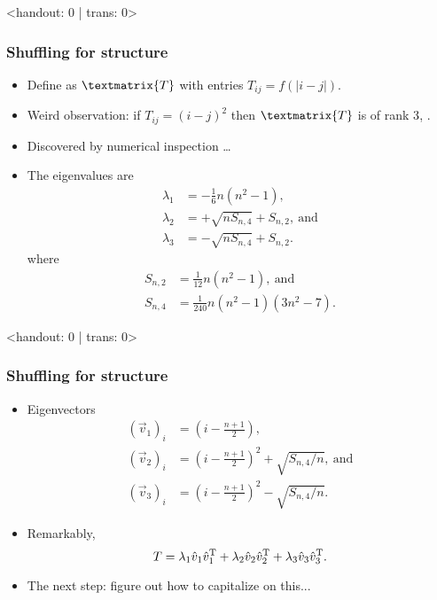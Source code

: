 \begin{frame}<handout: 0 | trans: 0>
  \frametitle{Shuffling for structure}

  \begin{itemize}
  \item<1->
    Define  as $\textmatrix{T}$ with
    entries $T_{ij} = f(|i-j|)$.
  \item<2->
    Weird observation: if $T_{ij} = (i-j)^2$
    then $\textmatrix{T}$ is of \alert{rank 3}, .
  \item<3->
    Discovered by numerical inspection \ldots
  \item<4->
    The eigenvalues are 
    \begin{align}
      \lambda_1 & = -\frac{1}{6}n(n^2-1), \nonumber \\
      \lambda_2 & = +\sqrt{n S_{n,4}} + S_{n,2}, \ \mbox{and} \nonumber \\
      \lambda_3 & = -\sqrt{n S_{n,4}} + S_{n,2}. \nonumber
    \end{align}
    where
    \begin{align}
      S_{n,2} &= \frac{1}{12} n (n^2-1), \ \mbox{and} \nonumber \\
      S_{n,4} & = \frac{1}{240}n(n^2-1)(3n^2 - 7).
      \nonumber
    \end{align}

  \end{itemize}

\end{frame}

\begin{frame}<handout: 0 | trans: 0>
  \frametitle{Shuffling for structure}

  \begin{itemize}
  \item<1->
    Eigenvectors
    \begin{align}
      \left(\vec{v}_1\right)_i & = \left( i - \frac{n+1}{2} \right), \nonumber \\
      \left(\vec{v}_2\right)_i & = \left( i - \frac{n+1}{2} \right)^2  + \sqrt{S_{n,4}/n},
      \ \mbox{and} \nonumber \\
      \left(\vec{v}_3\right)_i & = \left( i - \frac{n+1}{2} \right)^2  - \sqrt{S_{n,4}/n}.
      \nonumber
    \end{align}
  \item<2->
    Remarkably,
    $$
    T = 
    \lambda_1 \hat{v}_1 \hat{v}_1^{\textnormal{T}}
    +
    \lambda_2 \hat{v}_2 \hat{v}_2^{\textnormal{T}}
    +
    \lambda_3 \hat{v}_3 \hat{v}_3^{\textnormal{T}}.
    $$
  \item<3->
    \alert{The next step:} figure out how to capitalize on this...
  \end{itemize}

\end{frame}


